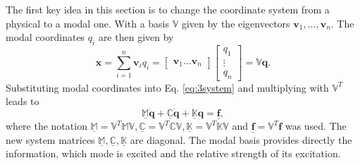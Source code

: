 \documentclass[conference]{journal}%
\newcommand{\bb}[1]{\mathbb{#1}}
\newcommand{\B}[1]{\mathbf{#1}}
\newcommand{\Bx}{\B{x}}
\newcommand{\Bv}{\B{v}}
\newcommand{\Bq}{\B{q}}
\begin{document}
	The first key idea in this section is to change the coordinate system from a physical to a modal one. With a basis $\bb{V}$ given by the eigenvectors $\Bv_1, \ldots, \Bv_n$. The modal coordinates $q_i$ are then given by
	\begin{equation} \label{eq:3modalB}
	\Bx = \sum\limits_{i=1}^{n} \Bv_i q_i =
	\begin{bmatrix} \Bv_1 \ldots \Bv_n \end{bmatrix}
	\begin{bmatrix} q_1 \\ \vdots \\ q_n \end{bmatrix} 
	= \bb{V} \Bq.
	\end{equation}
	Substituting modal coordinates into Eq. \eqref{eq:3system} and multiplying with $ \bb{V}^T $ leads to
	\begin{equation} \label{eq:3modalS}
	\underline{\bb{M}} \ddot{\Bq} + \underline{\bb{C}} \dot{\Bq} + \underline{\bb{K}} \Bq = \underline{\B{f}},
	\end{equation}
	where the notation $\underline{\bb{M}} = \bb{V}^T \bb{M} \bb{V}, \underline{\bb{C}} = \bb{V}^T \bb{C} \bb{V}, \underline{\bb{K}} = \bb{V}^T \bb{K} \bb{V}$ and $ \underline{\B{f}} = \bb{V}^T \B{f}$ was used. The new system matrices $\underline{\bb{M}}, \underline{\bb{C}}, \underline{\bb{K}}$ are diagonal. The modal basis provides directly the information, which mode is excited and the relative strength of its excitation. 
	
\end{document}
